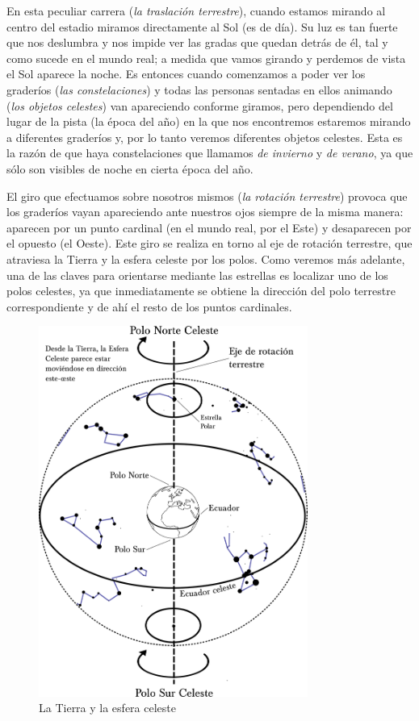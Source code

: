 \documentclass[12pt]{memoir}
\begin{document}
En esta peculiar carrera (\textit{la traslación terrestre}), cuando estamos mirando al centro del estadio miramos directamente al Sol (es de día). Su luz es tan fuerte que nos deslumbra y nos impide ver las gradas que quedan detrás de él, tal y como sucede en el mundo real; a medida que vamos girando y perdemos de vista el Sol aparece la noche. Es entonces cuando comenzamos a poder ver los graderíos (\textit{las constelaciones}) y todas las personas sentadas en ellos animando (\textit{los objetos celestes}) van apareciendo conforme giramos, pero dependiendo del lugar de la pista (la época del año) en la que nos encontremos estaremos mirando a diferentes graderíos y, por lo tanto veremos diferentes objetos celestes. Esta es la razón de que haya constelaciones que llamamos \textit{de invierno} y \textit{de verano}, ya que sólo son visibles de noche en cierta época del año.

El giro que efectuamos sobre nosotros mismos (\textit{la rotación terrestre}) provoca que los graderíos vayan apareciendo ante nuestros ojos siempre de la misma manera: aparecen por un punto cardinal (en el mundo real, por el Este) y desaparecen por el opuesto (el Oeste). Este giro se realiza en torno al eje de rotación terrestre, que atraviesa la Tierra y la esfera celeste por los polos. Como veremos más adelante, una de las claves para orientarse mediante las estrellas es localizar uno de los polos celestes, ya que inmediatamente se obtiene la dirección del polo terrestre correspondiente y de ahí el resto de los puntos cardinales.

\vspace*{0.4in}

\begin{figure}[ht]
 \centering
 \includegraphics[width=250pt,keepaspectratio=true]{./esquema_cielo.png}
 \caption{La Tierra y la esfera celeste}
 \label{tierra_esfera}
\end{figure}
\end{document}
